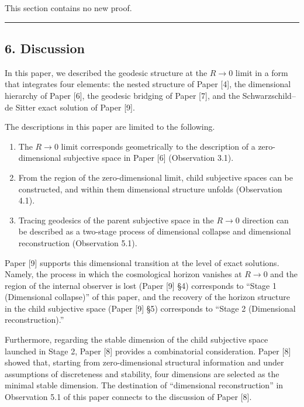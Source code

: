 \documentclass[a4paper,11pt]{article}
\theoremstyle{definition}
\providecommand{\tightlist}{\setlength{\itemsep}{0pt}\setlength{\parskip}{0pt}}
\begin{document}
This section contains no new proof.

\begin{center}\rule{0.5\linewidth}{0.5pt}\end{center}

\subsection{6. Discussion}\label{discussion}

In this paper, we described the geodesic structure at the \(R \to 0\)
limit in a form that integrates four elements: the nested structure of
Paper {[}4{]}, the dimensional hierarchy of Paper {[}6{]}, the geodesic
bridging of Paper {[}7{]}, and the Schwarzschild--de Sitter exact
solution of Paper {[}9{]}.

The descriptions in this paper are limited to the following.

\begin{enumerate}
\def\labelenumi{\arabic{enumi}.}
\tightlist
\item
  The \(R \to 0\) limit corresponds geometrically to the description of
  a zero-dimensional subjective space in Paper {[}6{]} (Observation
  3.1).
\item
  From the region of the zero-dimensional limit, child subjective spaces
  can be constructed, and within them dimensional structure unfolds
  (Observation 4.1).
\item
  Tracing geodesics of the parent subjective space in the \(R \to 0\)
  direction can be described as a two-stage process of dimensional
  collapse and dimensional reconstruction (Observation 5.1).
\end{enumerate}

Paper {[}9{]} supports this dimensional transition at the level of exact
solutions. Namely, the process in which the cosmological horizon
vanishes at \(R \to 0\) and the region of the internal observer is lost
(Paper {[}9{]} §4) corresponds to ``Stage 1 (Dimensional collapse)'' of
this paper, and the recovery of the horizon structure in the child
subjective space (Paper {[}9{]} §5) corresponds to ``Stage 2
(Dimensional reconstruction).''

Furthermore, regarding the stable dimension of the child subjective
space launched in Stage 2, Paper {[}8{]} provides a combinatorial
consideration. Paper {[}8{]} showed that, starting from zero-dimensional
structural information and under assumptions of discreteness and
stability, four dimensions are selected as the minimal stable dimension.
The destination of ``dimensional reconstruction'' in Observation 5.1 of
this paper connects to the discussion of Paper {[}8{]}.
\end{document}
